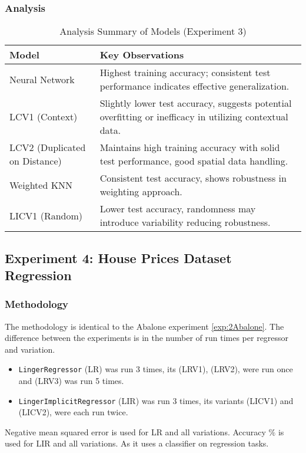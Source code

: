 \documentclass[a4paper, 12pt]{report}
\begin{document}
\subsubsection{Analysis}
\begin{table}[H]
    \centering
    \caption{Analysis Summary of Models (Experiment 3)}
    \label{tab:concise_analysis_summary_exp3}
    \begin{tabular}{|l|l|}
    \hline
    \textbf{Model} & \textbf{Key Observations} \\
    \hline
    Neural Network & Highest training accuracy; consistent test performance indicates effective generalization. \\
    \hline
    LCV1 (Context) & Slightly lower test accuracy, suggests potential overfitting or inefficacy in utilizing contextual data. \\
    \hline
    LCV2 (Duplicated on Distance) & Maintains high training accuracy with solid test performance, good spatial data handling. \\
    \hline
    Weighted KNN & Consistent test accuracy, shows robustness in weighting approach. \\
    \hline
    LICV1 (Random) & Lower test accuracy, randomness may introduce variability reducing robustness. \\
    \hline
    \end{tabular}
\end{table}

\subsection{Experiment 4: House Prices Dataset Regression}
\subsubsection{Methodology}
The methodology is identical to the Abalone experiment \ref{exp:2Abalone}. 
The difference between  the experiments is in the number of run times per regressor and variation.
\begin{itemize}
    \item \texttt{LingerRegressor} (LR) was run 3 times, its (LRV1), (LRV2), were run once and (LRV3) was run 5 times.
    \item \texttt{LingerImplicitRegressor} (LIR) was run 3 times, its variants (LICV1) and (LICV2), were each run twice.
\end{itemize}

Negative mean squared error is used for LR and all variations.
Accuracy $\%$ is used for LIR and all variations. As it uses a classifier on regression tasks.
\end{document}
